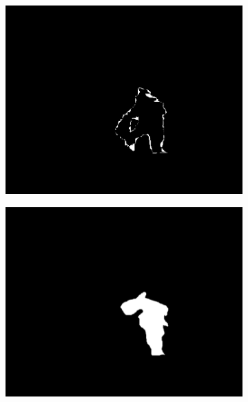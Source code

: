 \documentclass[14pt, a4paper]{extreport}
\begin{document}
\begin{figure}[h!]
\begin{subfigure}{.32\textwidth}
			\includegraphics[width = \textwidth]{image/chapter_3/examples/mask_dif/206}
		\end{subfigure}
		\begin{subfigure}{.32\textwidth}
			\centering
			\includegraphics[width = \textwidth]{image/chapter_3/examples/mask_razmet/185}
		\end{subfigure}
		\begin{subfigure}{.32\textwidth}
			\centering

\end{subfigure}
\end{figure}
\end{document}
